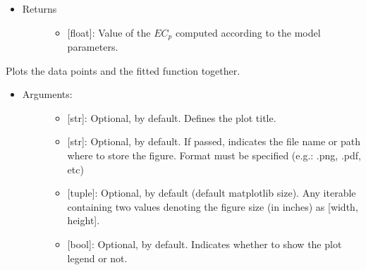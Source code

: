 \documentclass[letterpaper,10pt,english]{sphinxmanual}
\begin{document}
\begin{fulllineitems}
\begin{fulllineitems}
\begin{itemize}
\begin{description}
\begin{itemize}
\end{itemize}

\end{description}

\item {} \begin{description}
\item[{Returns}] \leavevmode\begin{itemize}
\item {} 
{[}float{]}: Value of the \(EC_{p}\) computed according
to the model parameters.

\end{itemize}

\end{description}

\end{itemize}

\end{fulllineitems}


\begin{fulllineitems}
\label{\detokenize{models:data_tools.models.DoseResponse.plot}}
Plots the data points and the fitted function together.
\begin{itemize}
\item {} \begin{description}
\item[{Arguments:}] \leavevmode\begin{itemize}
\item {} 
 {[}str{]}: Optional,  by default. Defines the
plot title.

\item {} 
 {[}str{]}: Optional,  by default. If
passed, indicates the file name or path where to store the
figure. Format must be specified (e.g.: .png, .pdf, etc)

\item {} 
 {[}tuple{]}: Optional,  by default (default
matplotlib size). Any iterable containing two values
denoting the figure size (in inches) as {[}width, height{]}.

\item {} 
 {[}bool{]}: Optional,  by default. Indicates
whether to show the plot legend or not.


\end{itemize}
\end{description}
\end{itemize}
\end{fulllineitems}
\end{fulllineitems}
\end{document}
